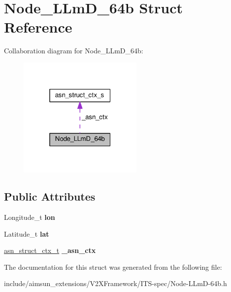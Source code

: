 \hypertarget{structNode__LLmD__64b}{}\section{Node\+\_\+\+L\+Lm\+D\+\_\+64b Struct Reference}
\label{structNode__LLmD__64b}


Collaboration diagram for Node\+\_\+\+L\+Lm\+D\+\_\+64b\+:\nopagebreak
\begin{figure}[H]
\begin{center}
\leavevmode
\includegraphics[width=172pt]{structNode__LLmD__64b__coll__graph}
\end{center}
\end{figure}
\subsection*{Public Attributes}
\begin{DoxyCompactItemize}
\item 
Longitude\+\_\+t {\bfseries lon}\hypertarget{structNode__LLmD__64b_a3384f632e1d782244575609390e18e54}{}\label{structNode__LLmD__64b_a3384f632e1d782244575609390e18e54}

\item 
Latitude\+\_\+t {\bfseries lat}\hypertarget{structNode__LLmD__64b_aa7c968211607cb3becfb147d73599e1f}{}\label{structNode__LLmD__64b_aa7c968211607cb3becfb147d73599e1f}

\item 
\hyperlink{structasn__struct__ctx__s}{asn\+\_\+struct\+\_\+ctx\+\_\+t} {\bfseries \+\_\+asn\+\_\+ctx}\hypertarget{structNode__LLmD__64b_a40aea1f3119bd366ebf14a3cae69ed1a}{}\label{structNode__LLmD__64b_a40aea1f3119bd366ebf14a3cae69ed1a}

\end{DoxyCompactItemize}


The documentation for this struct was generated from the following file\+:\begin{DoxyCompactItemize}
\item 
include/aimsun\+\_\+extensions/\+V2\+X\+Framework/\+I\+T\+S-\/spec/Node-\/\+L\+Lm\+D-\/64b.\+h\end{DoxyCompactItemize}

